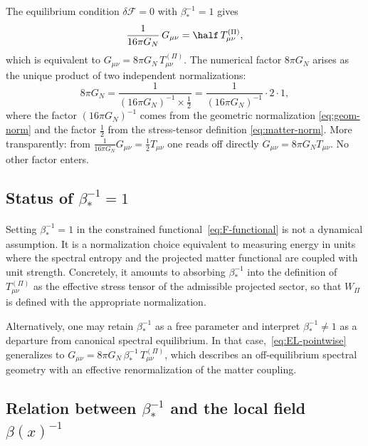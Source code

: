   \begin{proposition}
    \label{prop:normalization}
    The equilibrium condition $\delta\mathcal{F} = 0$ with $\beta_*^{-1} = 1$ gives
    \begin{equation}
      \frac{1}{16\pi G_N}\,G_{\mu\nu}
      = \half\,T^{(\Pi)}_{\mu\nu},
    \end{equation}
    which is equivalent to $G_{\mu\nu} = 8\pi G_N\,T^{(\Pi)}_{\mu\nu}$.
    The numerical factor $8\pi G_N$ arises as the unique product of two independent
    normalizations:
    \begin{equation}
      8\pi G_N
      = \frac{1}{(16\pi G_N)^{-1} \times \tfrac{1}{2}}
      = \frac{1}{(16\pi G_N)^{-1}} \cdot 2
      \cdot 1,
      \label{eq:8piG-factorization}
    \end{equation}
    where the factor $(16\pi G_N)^{-1}$ comes from the geometric normalization
    \eqref{eq:geom-norm} and the factor $\frac{1}{2}$ from the stress-tensor
    definition \eqref{eq:matter-norm}.
    More transparently: from $\frac{1}{16\pi G_N}G_{\mu\nu} = \frac{1}{2}T_{\mu\nu}$
    one reads off directly $G_{\mu\nu} = 8\pi G_N T_{\mu\nu}$.
    No other factor enters.
  \end{proposition}

\subsection{Status of $\beta_*^{-1} = 1$}
  \label{subsec:beta-star-status}

  Setting $\beta_*^{-1} = 1$ in the constrained functional~\eqref{eq:F-functional}
  is not a dynamical assumption.
  It is a normalization choice equivalent to measuring energy in units where the
  spectral entropy and the projected matter functional are coupled with unit strength.
  Concretely, it amounts to absorbing $\beta_*^{-1}$ into the definition of
  $T^{(\Pi)}_{\mu\nu}$ as the effective stress tensor of the admissible projected
  sector, so that $W_\Pi$ is defined with the appropriate normalization.

  Alternatively, one may retain $\beta_*^{-1}$ as a free parameter and interpret
  $\beta_*^{-1} \neq 1$ as a departure from canonical spectral equilibrium.
  In that case,~\eqref{eq:EL-pointwise} generalizes to
  $G_{\mu\nu} = 8\pi G_N\,\beta_*^{-1}\,T^{(\Pi)}_{\mu\nu}$,
  which describes an off-equilibrium spectral geometry with an effective renormalization
  of the matter coupling.

\subsection{Relation between $\beta_*^{-1}$ and the local field $\beta(x)^{-1}$}
  \label{subsec:beta-relation}

